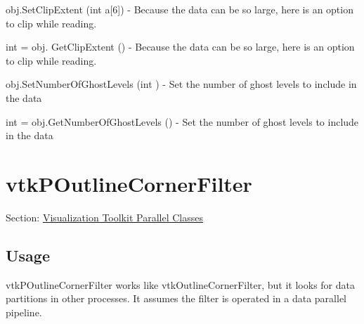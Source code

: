 \begin{DoxyItemize}
\item {\ttfamily obj.\-Set\-Clip\-Extent (int a\mbox{[}6\mbox{]})} -\/ Because the data can be so large, here is an option to clip while reading.  
\item {\ttfamily int = obj. Get\-Clip\-Extent ()} -\/ Because the data can be so large, here is an option to clip while reading.  
\item {\ttfamily obj.\-Set\-Number\-Of\-Ghost\-Levels (int )} -\/ Set the number of ghost levels to include in the data  
\item {\ttfamily int = obj.\-Get\-Number\-Of\-Ghost\-Levels ()} -\/ Set the number of ghost levels to include in the data  
\end{DoxyItemize}\hypertarget{vtkparallel_vtkpoutlinecornerfilter}{}\section{vtk\-P\-Outline\-Corner\-Filter}\label{vtkparallel_vtkpoutlinecornerfilter}
Section\-: \hyperlink{sec_vtkparallel}{Visualization Toolkit Parallel Classes} \hypertarget{vtkwidgets_vtkxyplotwidget_Usage}{}\subsection{Usage}\label{vtkwidgets_vtkxyplotwidget_Usage}
vtk\-P\-Outline\-Corner\-Filter works like vtk\-Outline\-Corner\-Filter, but it looks for data partitions in other processes. It assumes the filter is operated in a data parallel pipeline.

